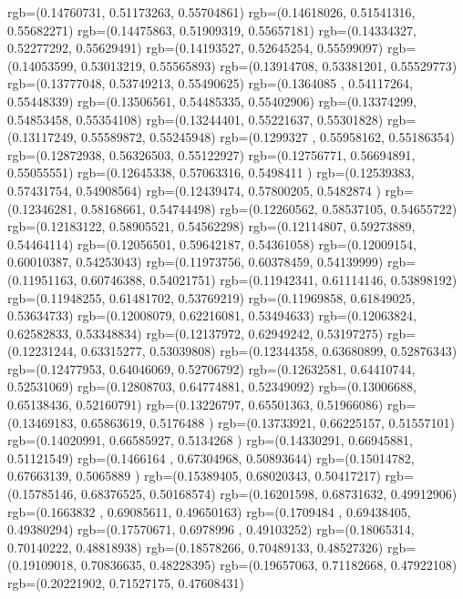 {{{			rgb=(0.14760731,  0.51173263,  0.55704861)
			rgb=(0.14618026,  0.51541316,  0.55682271)
			rgb=(0.14475863,  0.51909319,  0.55657181)
			rgb=(0.14334327,  0.52277292,  0.55629491)
			rgb=(0.14193527,  0.52645254,  0.55599097)
			rgb=(0.14053599,  0.53013219,  0.55565893)
			rgb=(0.13914708,  0.53381201,  0.55529773)
			rgb=(0.13777048,  0.53749213,  0.55490625)
			rgb=(0.1364085 ,  0.54117264,  0.55448339)
			rgb=(0.13506561,  0.54485335,  0.55402906)
			rgb=(0.13374299,  0.54853458,  0.55354108)
			rgb=(0.13244401,  0.55221637,  0.55301828)
			rgb=(0.13117249,  0.55589872,  0.55245948)
			rgb=(0.1299327 ,  0.55958162,  0.55186354)
			rgb=(0.12872938,  0.56326503,  0.55122927)
			rgb=(0.12756771,  0.56694891,  0.55055551)
			rgb=(0.12645338,  0.57063316,  0.5498411 )
			rgb=(0.12539383,  0.57431754,  0.54908564)
			rgb=(0.12439474,  0.57800205,  0.5482874 )
			rgb=(0.12346281,  0.58168661,  0.54744498)
			rgb=(0.12260562,  0.58537105,  0.54655722)
			rgb=(0.12183122,  0.58905521,  0.54562298)
			rgb=(0.12114807,  0.59273889,  0.54464114)
			rgb=(0.12056501,  0.59642187,  0.54361058)
			rgb=(0.12009154,  0.60010387,  0.54253043)
			rgb=(0.11973756,  0.60378459,  0.54139999)
			rgb=(0.11951163,  0.60746388,  0.54021751)
			rgb=(0.11942341,  0.61114146,  0.53898192)
			rgb=(0.11948255,  0.61481702,  0.53769219)
			rgb=(0.11969858,  0.61849025,  0.53634733)
			rgb=(0.12008079,  0.62216081,  0.53494633)
			rgb=(0.12063824,  0.62582833,  0.53348834)
			rgb=(0.12137972,  0.62949242,  0.53197275)
			rgb=(0.12231244,  0.63315277,  0.53039808)
			rgb=(0.12344358,  0.63680899,  0.52876343)
			rgb=(0.12477953,  0.64046069,  0.52706792)
			rgb=(0.12632581,  0.64410744,  0.52531069)
			rgb=(0.12808703,  0.64774881,  0.52349092)
			rgb=(0.13006688,  0.65138436,  0.52160791)
			rgb=(0.13226797,  0.65501363,  0.51966086)
			rgb=(0.13469183,  0.65863619,  0.5176488 )
			rgb=(0.13733921,  0.66225157,  0.51557101)
			rgb=(0.14020991,  0.66585927,  0.5134268 )
			rgb=(0.14330291,  0.66945881,  0.51121549)
			rgb=(0.1466164 ,  0.67304968,  0.50893644)
			rgb=(0.15014782,  0.67663139,  0.5065889 )
			rgb=(0.15389405,  0.68020343,  0.50417217)
			rgb=(0.15785146,  0.68376525,  0.50168574)
			rgb=(0.16201598,  0.68731632,  0.49912906)
			rgb=(0.1663832 ,  0.69085611,  0.49650163)
			rgb=(0.1709484 ,  0.69438405,  0.49380294)
			rgb=(0.17570671,  0.6978996 ,  0.49103252)
			rgb=(0.18065314,  0.70140222,  0.48818938)
			rgb=(0.18578266,  0.70489133,  0.48527326)
			rgb=(0.19109018,  0.70836635,  0.48228395)
			rgb=(0.19657063,  0.71182668,  0.47922108)
			rgb=(0.20221902,  0.71527175,  0.47608431)
}}}
